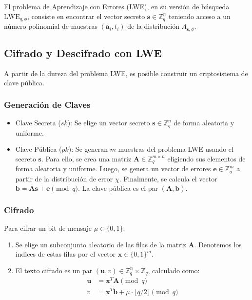 El problema de Aprendizaje con Errores (LWE), en su versión de búsqueda $\mathrm{LWE}_{q,\phi}$, consiste en encontrar el vector secreto $\mathbf{s} \in \mathbb{Z}_q^n$ teniendo acceso a un número polinomial de muestras $(\mathbf{a}_i, t_i)$ de la distribución $A_{\mathbf{s},\phi}$. 

\subsection{Cifrado y Descifrado con LWE}

A partir de la dureza del problema LWE, es posible construir un criptosistema de clave pública.

\subsubsection{Generación de Claves}
\begin{itemize}
    \item Clave Secreta ($sk$): Se elige un vector secreto $\mathbf{s} \in \mathbb{Z}_q^n$ de forma aleatoria y uniforme.
    \item Clave Pública ($pk$): Se generan $m$ muestras del problema LWE usando el secreto $\mathbf{s}$. Para ello, se crea una matriz $\mathbf{A} \in \mathbb{Z}_q^{m \times n}$ eligiendo sus elementos de forma aleatoria y uniforme. Luego, se genera un vector de errores $\mathbf{e} \in \mathbb{Z}_q^m$ a partir de la distribución de error $\chi$. Finalmente, se calcula el vector $\mathbf{b} = \mathbf{A}\mathbf{s} + \mathbf{e} \pmod{q}$. La clave pública es el par $(\mathbf{A}, \mathbf{b})$.
\end{itemize}

\subsubsection{Cifrado}
Para cifrar un bit de mensaje $\mu \in \{0, 1\}$:
\begin{enumerate}
    \item Se elige un subconjunto aleatorio de las filas de la matriz $\mathbf{A}$. Denotemos los índices de estas filas por el vector $\mathbf{x} \in \{0, 1\}^m$.
    \item El texto cifrado es un par $(\mathbf{u}, v) \in \mathbb{Z}_q^n \times \mathbb{Z}_q$, calculado como:
    \begin{align}
        \mathbf{u} &= \mathbf{x}^T \mathbf{A} \pmod{q} \\
        v &= \mathbf{x}^T \mathbf{b} + \mu \cdot \lfloor q/2 \rfloor \pmod{q}
    \end{align}
\end{enumerate}

